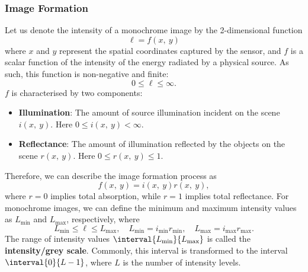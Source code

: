 \documentclass{article}
\begin{document}
\subsubsection{Image Formation}
Let us denote the intensity of a monochrome image by the 2-dimensional
function
\begin{equation*}
    \ell = f\left( x,\: y \right)
\end{equation*}
where \(x\) and \(y\) represent the spatial coordinates captured by the
sensor, and \(f\) is a scalar function of the intensity of the energy
radiated by a physical source. As such, this function is non-negative
and finite:
\begin{equation*}
    0 \leqslant \ell \leqslant \infty.
\end{equation*}
\(f\) is characterised by two components:
\begin{itemize}
    \item \textbf{Illumination}: The amount of source illumination incident on the
          scene \(i\left( x,\: y \right)\). Here \(0 \leqslant i\left( x,\: y \right) < \infty\).
    \item \textbf{Reflectance}: The amount of illumination reflected by
          the objects on the scene \(r\left( x,\: y \right)\). Here
          \(0 \leqslant r\left( x,\: y \right) \leqslant 1\).
\end{itemize}
Therefore, we can describe the image formation process as
\begin{equation*}
    f\left( x,\: y \right) = i\left( x,\: y \right) r\left( x,\: y \right),
\end{equation*}
where \(r = 0\) implies total absorption, while \(r = 1\) implies total reflectance.
For monochrome images, we can define the minimum and maximum intensity
values as \(L_{\text{min}}\) and \(L_{\text{max}}\), respectively,
where
\begin{equation*}
    L_{\text{min}} \leqslant \ell \leqslant L_{\text{max}}, \quad L_{\text{min}} = i_{\text{min}} r_{\text{min}}, \quad L_{\text{max}} = i_{\text{max}} r_{\text{max}}.
\end{equation*}
The range of intensity values \(\interval{L_{\text{min}}}{L_{\text{max}}}\)
is called the \textbf{intensity/grey scale}. Commonly, this interval is
transformed to the interval \(\interval{0}{L-1}\), where \(L\) is the
number of intensity levels.
\end{document}

